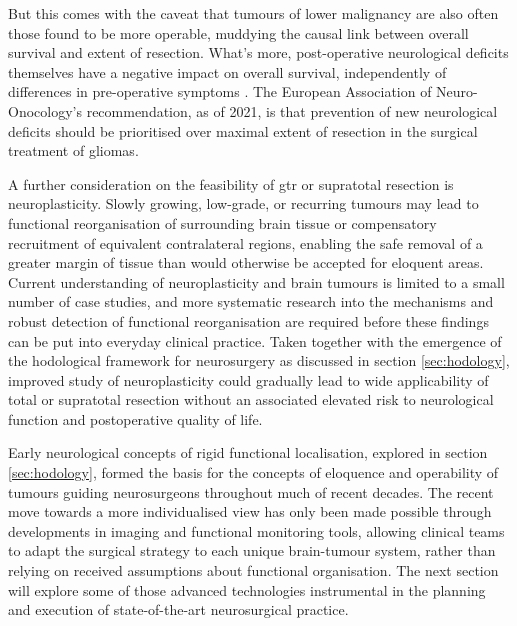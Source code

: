 But this comes with the caveat that tumours of lower malignancy are also often those found to be more operable, muddying the causal link between overall survival and extent of resection\autocite{Weller2021}.
What's more, post-operative neurological deficits themselves have a negative impact on overall survival, independently of differences in pre-operative symptoms \autocite{Rahman2016}.
The European Association of Neuro-Onocology's recommendation, as of 2021, is that prevention of new neurological deficits should be prioritised over maximal extent of resection in the surgical treatment of gliomas\autocite{Weller2021}.

A further consideration on the feasibility of \gls{gtr} or supratotal resection is neuroplasticity\autocite{Duffau2005}.
Slowly growing, low-grade, or recurring tumours may lead to functional reorganisation of surrounding brain tissue\autocite{Takahashi2012,Das2019} or compensatory recruitment of equivalent contralateral regions\autocite{Mitolo2022}, enabling the safe removal of a greater margin of tissue than would otherwise be accepted for eloquent areas\autocite{Rossi2019a}.
Current understanding of neuroplasticity and brain tumours is limited to a small number of case studies, and more systematic research into the mechanisms and robust detection of functional reorganisation are required before these findings can be put into everyday clinical practice\autocite{Duffau2005,Satoer2017}.
Taken together with the emergence of the hodological framework for neurosurgery as discussed in section \ref{sec:hodology}, improved study of neuroplasticity could gradually lead to wide applicability of total or supratotal resection without an associated elevated risk to neurological function and postoperative quality of life.

Early neurological concepts of rigid functional localisation, explored in section \ref{sec:hodology}, formed the basis for the concepts of eloquence and operability of tumours guiding neurosurgeons throughout much of recent decades.
The recent move towards a more individualised view has only been made possible through developments in imaging and functional monitoring tools, allowing clinical teams to adapt the surgical strategy to each unique brain-tumour system, rather than relying on received assumptions about functional organisation.
The next section will explore some of those advanced technologies instrumental in the planning and execution of state-of-the-art neurosurgical practice.


